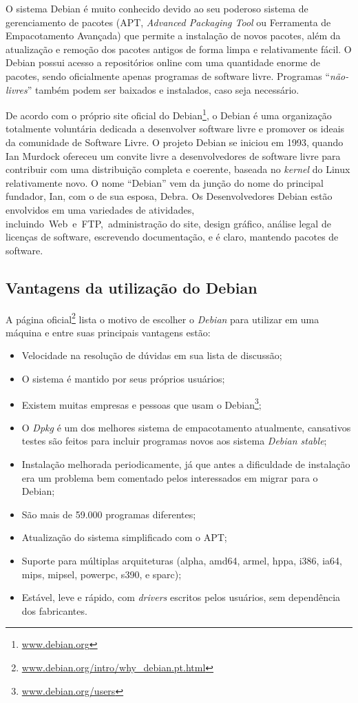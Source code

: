 O sistema Debian é muito conhecido devido ao seu poderoso sistema de gerenciamento de pacotes (APT, \textit{Advanced Packaging Tool} ou Ferramenta de Empacotamento Avançada) que permite a instalação de novos pacotes, além da atualização e remoção dos pacotes antigos de forma limpa e relativamente fácil. O Debian possui acesso a repositórios online com uma quantidade enorme de pacotes, sendo oficialmente apenas programas de software livre. Programas ``\textit{não-livres}'' também podem ser baixados e instalados, caso seja necessário.

De acordo com o próprio site oficial do Debian\footnote{\url{www.debian.org}}, o Debian é uma organização totalmente voluntária dedicada a desenvolver software livre e promover os ideais da comunidade de Software Livre. O projeto Debian se iniciou em 1993, quando Ian Murdock ofereceu um convite livre a desenvolvedores de software livre para contribuir com uma distribuição completa e coerente, baseada no \textit{kernel} do Linux relativamente novo. O nome “Debian” vem da junção do nome do principal fundador, Ian, com o de sua esposa, Debra. Os Desenvolvedores Debian estão envolvidos em uma variedades de atividades, incluindo Web e FTP, administração do site, design gráfico, análise legal de licenças de software, escrevendo documentação, e é claro, mantendo pacotes de software.

\subsection{Vantagens da utilização do Debian}
A página oficial\footnote{\url{www.debian.org/intro/why\_debian.pt.html}} lista o motivo de escolher o \textit{Debian} para utilizar em uma máquina e entre suas principais vantagens estão:

\begin{itemize}
	\item Velocidade na resolução de dúvidas em sua lista de discussão;
	\item O sistema é mantido por seus próprios usuários;
	\item Existem muitas empresas e pessoas que usam o Debian\footnote{\url{www.debian.org/users}};
	\item O \textit{Dpkg} é um dos melhores sistema de empacotamento atualmente, cansativos testes são feitos para incluir programas novos aos sistema \textit{Debian stable};
	\item Instalação melhorada periodicamente, já que antes a dificuldade de instalação era um problema bem comentado pelos interessados em migrar para o Debian;
	\item São mais de 59.000 programas diferentes;
	\item Atualização do sistema simplificado com o APT;
	\item Suporte para múltiplas arquiteturas (alpha, amd64, armel, hppa, i386, ia64, mips, mipsel, powerpc, s390, e sparc);
	\item Estável, leve e rápido, com \textit{drivers} escritos pelos usuários, sem dependência dos fabricantes.
\end{itemize}

